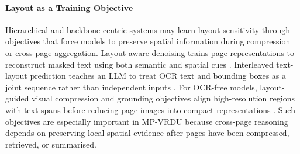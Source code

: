 \documentclass[11pt]{article}
\begin{document}

\paragraph{Layout as a Training Objective}
Hierarchical and backbone-centric systems may learn layout sensitivity through objectives that force models to preserve spatial information during compression or cross-page aggregation. Layout-aware denoising trains page representations to reconstruct masked text using both semantic and spatial cues \cite{tito2023hierarchical}. Interleaved text-layout prediction teaches an LLM to treat OCR text and bounding boxes as a joint sequence rather than independent inputs \cite{zhu2025simple}. For OCR-free models, layout-guided visual compression and grounding objectives align high-resolution regions with text spans before reducing page images into compact representations \cite{hu2025mplug, yu2024texthawk2}. Such objectives are especially important in MP-VRDU because cross-page reasoning depends on preserving local spatial evidence after pages have been compressed, retrieved, or summarised.

\end{document}
